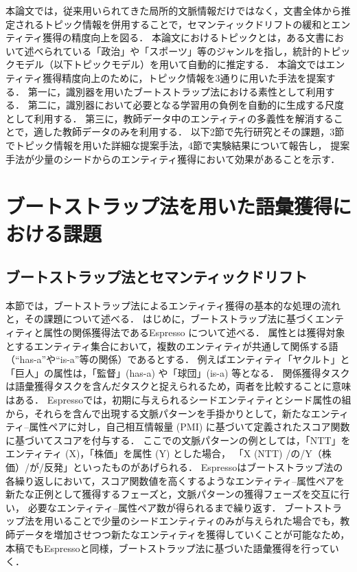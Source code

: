 \documentclass[japanese]{jnlp_1.4}
\begin{document}
本論文では，従来用いられてきた局所的文脈情報だけではなく，文書全体から推定されるトピック情報を併用することで，セマンティックドリフトの緩和とエンティティ獲得の精度向上を図る．
本論文におけるトピックとは，ある文書において述べられている「政治」や「スポーツ」等のジャンルを指し，統計的トピックモデル（以下トピックモデル）を用いて自動的に推定する．
本論文ではエンティティ獲得精度向上のために，トピック情報を3通りに用いた手法を提案する．
第一に，識別器を用いたブートストラップ法における素性として利用する．
第二に，識別器において必要となる学習用の負例を自動的に生成する尺度として利用する．
第三に，教師データ中のエンティティの多義性を解消することで，適した教師データのみを利用する．
以下2節で先行研究とその課題，3節でトピック情報を用いた詳細な提案手法，4節で実験結果について報告し，
提案手法が少量のシードからのエンティティ獲得において効果があることを示す．


\section{ブートストラップ法を用いた語彙獲得における課題}

\subsection{ブートストラップ法とセマンティックドリフト}

本節では，ブートストラップ法によるエンティティ獲得の基本的な処理の流れと，その課題について述べる．
はじめに，ブートストラップ法に基づくエンティティと属性の関係獲得法であるEspresso  \cite{pantel2006espresso} について述べる．
属性とは獲得対象とするエンティティ集合において，複数のエンティティが共通して関係する語（``has-a''や``is-a''等の関係）であるとする．
例えばエンティティ「ヤクルト」と「巨人」の属性は，「監督」(has-a) や「球団」(is-a) 等となる．
関係獲得タスクは語彙獲得タスクを含んだタスクと捉えられるため，両者を比較することに意味はある．
Espressoでは，初期に与えられるシードエンティティとシード属性の組から，それらを含んで出現する文脈パターンを手掛かりとして，新たなエンティティ--属性ペアに対し，自己相互情報量 (PMI) に基づいて定義されたスコア関数に基づいてスコアを付与する．
ここでの文脈パターンの例としては，「NTT」をエンティティ (X)，「株価」を属性 (Y) とした場合，
「X (NTT) /の/Y（株価）/が/反発」といったものがあげられる．
Espressoはブートストラップ法の各繰り返しにおいて，スコア関数値を高くするようなエンティティ--属性ペアを新たな正例として獲得するフェーズと，文脈パターンの獲得フェーズを交互に行い，
必要なエンティティ--属性ペア数が得られるまで繰り返す．
ブートストラップ法を用いることで少量のシードエンティティのみが与えられた場合でも，教師データを増加させつつ新たなエンティティを獲得していくことが可能なため，
本稿でもEspressoと同様，ブートストラップ法に基づいた語彙獲得を行っていく．
\end{document}
